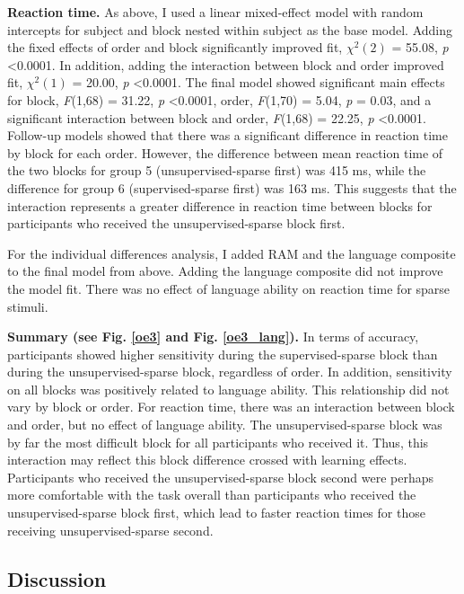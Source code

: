 \documentclass[../dissertation.tex]{subfiles}
\begin{document}
	\textbf{Reaction time.} As above, I used a linear mixed-effect model with random intercepts for subject and block nested within subject as the base model. Adding the fixed effects of order and block significantly improved fit, $\chi^{2}(2)$ = 55.08, \textit{p} \textless 0.0001. In addition, adding the interaction between block and order improved fit,  $\chi^{2}(1)$ = 20.00, \textit{p} \textless 0.0001. The final model showed significant main effects for block, \textit{F}(1,68) = 31.22, \textit{p} \textless 0.0001, order, \textit{F}(1,70) = 5.04, \textit{p} = 0.03, and a significant interaction between block and order, \textit{F}(1,68) = 22.25, \textit{p} \textless 0.0001. Follow-up models showed that there was a significant difference in reaction time by block for each order. However, the difference between mean reaction time of the two blocks for group 5 (unsupervised-sparse first) was 415 ms, while the difference for group 6 (supervised-sparse first) was 163 ms. This suggests that the interaction represents a greater difference in reaction time between blocks for participants who received the unsupervised-sparse block first.  \par 
	For the individual differences analysis, I added RAM and the language composite to the final model from above. Adding the language composite did not improve the model fit. There was no effect of language ability on reaction time for sparse stimuli. \par	
	\textbf{Summary (see Fig. \ref{oe3} and Fig. \ref{oe3_lang}).} In terms of accuracy, participants showed higher sensitivity during the supervised-sparse block than during the unsupervised-sparse block, regardless of order. In addition, sensitivity on all blocks was positively related to language ability. This relationship did not vary by block or order. For reaction time, there was an interaction between block and order, but no effect of language ability. The unsupervised-sparse block was by far the most difficult block for all participants who received it. Thus, this interaction may reflect this block difference crossed with learning effects. Participants who received the unsupervised-sparse block second were perhaps more comfortable with the task overall than participants who received the unsupervised-sparse block first, which lead to faster reaction times for those receiving unsupervised-sparse second.

	
\subsection{Discussion}
\end{document}
